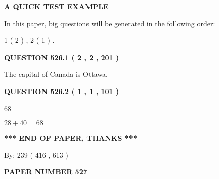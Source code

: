 \documentclass[12pt]{article}
\begin{document}
   
 \vspace{0.2in}
{\LARGE {\textbf{ A QUICK TEST EXAMPLE}}}
   
   
   
\vspace{0.2in}
   
In this paper, big questions will be generated in the following order: 
   
   
   1 ( 2 )
 ,
   2 ( 1 )
 .
  
\vspace{0.2in}
  
{\textbf{\Large{QUESTION
526.1 
 ( 2 , 2 , 201 )
}}}
  
  
 
 
\noindent{}
 
 
The capital of Canada is Ottawa.
 
 
 
 
  
\vspace{0.2in}
  
{\textbf{\Large{QUESTION
526.2 
 ( 1 , 1 , 101 )
}}}
  
  
 
 
\noindent{}

68
 
 
 
 
\noindent{}

$ %
28 +  %
40=   %
68$
 
 
   
   
 \vspace{0.2in}
 
   
   
   
   
\vspace{1.0in} 
{\textbf{\large{ *** END OF PAPER, THANKS *** }}} 
   
   
\hspace{1.0in} By: 
 239 ( 416 ,  613 )
   
   
   
   
\newpage 
\setcounter{page}{ 
   527001 } 
   
   
   
   
 {\textbf{ \Large{ PAPER NUMBER  527  }}}
   
   
\vspace{0.2in}
   
\end{document}
